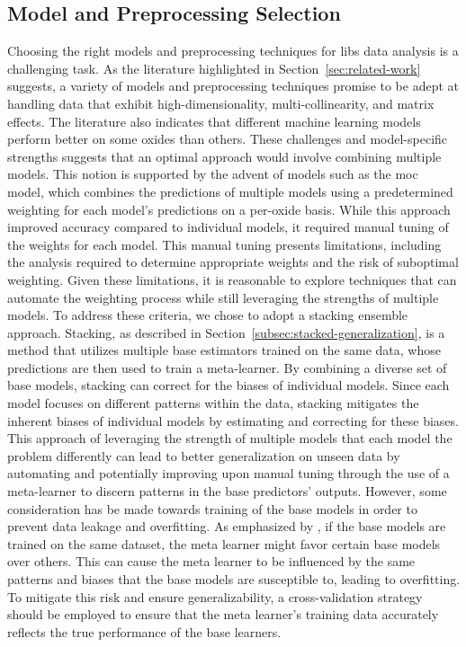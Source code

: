 \subsection{Model and Preprocessing Selection}

Choosing the right models and preprocessing techniques for \gls{libs} data analysis is a challenging task. 
As the literature highlighted in Section~\ref{sec:related-work} suggests, a variety of models and preprocessing techniques promise to be adept at handling data that exhibit high-dimensionality, multi-collinearity, and matrix effects.
The literature also indicates that different machine learning models perform better on some oxides than others.
These challenges and model-specific strengths suggests that an optimal approach would involve combining multiple models. 
This notion is supported by the advent of models such as the \gls{moc}~\cite{cleggRecalibrationMarsScience2017} model, which combines the predictions of multiple models using a predetermined weighting for each model's predictions on a per-oxide basis.
While this approach improved accuracy compared to individual models, it required manual tuning of the weights for each model.
This manual tuning presents limitations, including the analysis required to determine appropriate weights and the risk of suboptimal weighting.
Given these limitations, it is reasonable to explore techniques that can automate the weighting process while still leveraging the strengths of multiple models.
To address these criteria, we chose to adopt a stacking ensemble approach. 
Stacking, as described in Section~\ref{subsec:stacked-generalization}, is a method that utilizes multiple base estimators trained on the same data, whose predictions are then used to train a meta-learner.
By combining a diverse set of base models, stacking can correct for the biases of individual models.
Since each model focuses on different patterns within the data, stacking mitigates the inherent biases of individual models by estimating and correcting for these biases.
This approach of leveraging the strength of multiple models that each model the problem differently can lead to better generalization on unseen data by automating and potentially improving upon manual tuning through the use of a meta-learner to discern patterns in the base predictors' outputs. \cite{wolpertstacked_1992} \cite{survey_of_ensemble_learning}
However, some consideration has be made towards training of the base models in order to prevent data leakage and overfitting.
As emphasized by \citet{cvstacking}, if the base models are trained on the same dataset, the meta learner might favor certain base models over others.
This can cause the meta learner to be influenced by the same patterns and biases that the base models are susceptible to, leading to overfitting.
To mitigate this risk and ensure generalizability, a cross-validation strategy should be employed to ensure that the meta learner's training data accurately reflects the true performance of the base learners.

